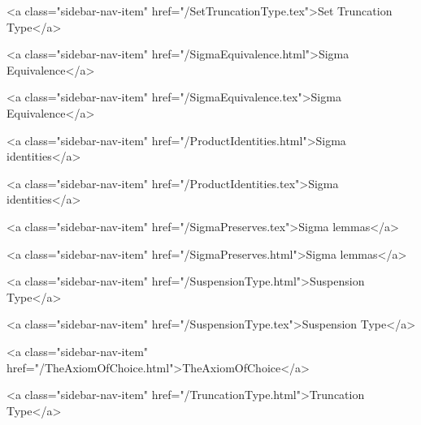       
    
      
        
          <a class="sidebar-nav-item" href="/SetTruncationType.tex">Set Truncation Type</a>
        
      
    
      
        
          <a class="sidebar-nav-item" href="/SigmaEquivalence.html">Sigma Equivalence</a>
        
      
    
      
        
          <a class="sidebar-nav-item" href="/SigmaEquivalence.tex">Sigma Equivalence</a>
        
      
    
      
        
          <a class="sidebar-nav-item" href="/ProductIdentities.html">Sigma identities</a>
        
      
    
      
        
          <a class="sidebar-nav-item" href="/ProductIdentities.tex">Sigma identities</a>
        
      
    
      
        
          <a class="sidebar-nav-item" href="/SigmaPreserves.tex">Sigma lemmas</a>
        
      
    
      
        
          <a class="sidebar-nav-item" href="/SigmaPreserves.html">Sigma lemmas</a>
        
      
    
      
        
          <a class="sidebar-nav-item" href="/SuspensionType.html">Suspension Type</a>
        
      
    
      
        
          <a class="sidebar-nav-item" href="/SuspensionType.tex">Suspension Type</a>
        
      
    
      
        
          <a class="sidebar-nav-item" href="/TheAxiomOfChoice.html">TheAxiomOfChoice</a>
        
      
    
      
        
          <a class="sidebar-nav-item" href="/TruncationType.html">Truncation Type</a>
        
